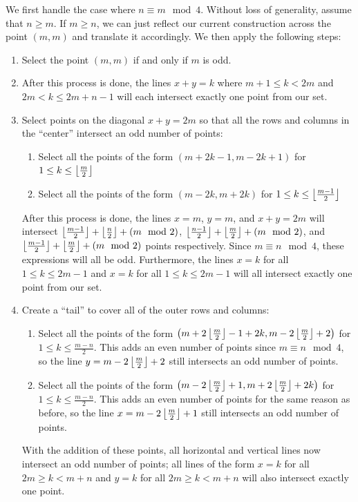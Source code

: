\documentclass[10pt]{../usamts}
\begin{document}
\begin{solution}
\clearpage
We first handle the case where $n \equiv m \mod 4$. Without loss of generality, assume that $n \geq m$. If $m \geq n$, we can just reflect our current construction across the point $(m,m)$ and translate it accordingly. We then apply the following steps:
\begin{enumerate}
    \item Select the point $(m,m)$ if and only if $m$ is odd.
    \item \mainaxis
    After this process is done, the lines $x+y = k$ where $m+1 \leq k < 2m$ and $2m < k \leq 2m+n-1$ will each intersect exactly one point from our set.
    \item Select points on the diagonal $x+y = 2m$ so that all the rows and columns in the ``center'' intersect an odd number of points:
    \begin{enumerate}
        \item Select all the points of the form $(m+2k-1,m-2k+1)$ for $1 \leq k \leq \left\lfloor \frac{m}{2} \right\rfloor$
        \item Select all the points of the form $(m-2k,m+2k)$ for $1 \leq k \leq \left\lfloor \frac{m-1}{2} \right\rfloor$
    \end{enumerate}
    After this process is done, the lines $x=m$, $y=m$, and $x+y = 2m$ will intersect $\left\lfloor \frac{m-1}{2} \right\rfloor + \left\lfloor \frac{n}{2} \right\rfloor + (m \mod 2)$, $\left\lfloor \frac{n-1}{2} \right\rfloor + \left\lfloor \frac{m}{2} \right\rfloor + (m \mod 2)$, and $\left\lfloor \frac{m-1}{2} \right\rfloor + \left\lfloor \frac{m}{2} \right\rfloor + (m \mod 2)$ points respectively. Since $m \equiv n \mod 4$, these expressions will all be odd. Furthermore, the lines $x=k$ for all $1 \leq k \leq 2m-1$ and $x=k$ for all $1 \leq k \leq 2m-1$ will all intersect exactly one point from our set.
    \item Create a ``tail'' to cover all of the outer rows and columns:
    \begin{enumerate}
        \item Select all the points of the form $\left(  m+2\left\lfloor \frac{m}{2} \right\rfloor-1+2k, m-2\left\lfloor \frac{m}{2} \right\rfloor+2  \right)$ for $1 \leq k \leq \frac{m-n}{2}$. This adds an even number of points since $m \equiv n \mod 4$, so the line $y = m-2\left\lfloor \frac{m}{2} \right\rfloor+2$ still intersects an odd number of points.
        \item Select all the points of the form $\left(  m-2\left\lfloor \frac{m}{2} \right\rfloor+1, m+2\left\lfloor \frac{m}{2} \right\rfloor+2k  \right)$ for $1 \leq k \leq \frac{m-n}{2}$. This adds an even number of points for the same reason as before, so the line $x = m-2\left\lfloor \frac{m}{2} \right\rfloor+1$ still intersects an odd number of points.
    \end{enumerate}
    With the addition of these points, all horizontal and vertical lines now intersect an odd number of points; all lines of the form $x = k$ for all $2m \geq k < m+n$ and $y=k$ for all $2m \geq k < m+n$ will also intersect exactly one point.
    

\end{enumerate}
\end{solution}
\end{document}
